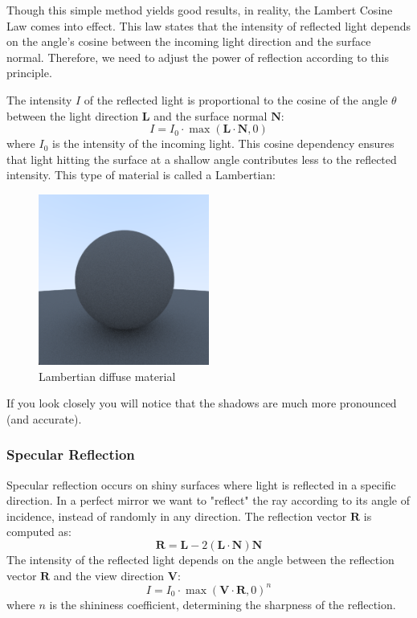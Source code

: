 \documentclass[12pt]{article}
\begin{document}
Though this simple method yields good results, in reality, the Lambert Cosine Law comes into effect. This law states that the intensity of reflected light depends on the angle's cosine between the incoming light direction and the surface normal. Therefore, we need to adjust the power of reflection according to this principle.

The intensity \(I\) of the reflected light is proportional to the cosine of the angle \(\theta\) between the light direction \(\mathbf{L}\) and the surface normal \(\mathbf{N}\):
\[
    I = I_0 \cdot \max(\mathbf{L} \cdot \mathbf{N}, 0)
\]
where \(I_0\) is the intensity of the incoming light. This cosine dependency ensures that light hitting the surface at a shallow angle contributes less to the reflected intensity.
This type of material is called a Lambertian:

\begin{figure}[H]
    \centering
    \includegraphics[width=0.5\textwidth]{images/lambertian/lambertian_diffuse.png}
    \caption{Lambertian diffuse material}
    \label{fig:lambdiffmat}
\end{figure}

If you look closely you will notice that the shadows are much more pronounced (and accurate).

\subsubsection{Specular Reflection}
Specular reflection occurs on shiny surfaces where light is reflected in a specific direction. In a perfect mirror we want to "reflect" the ray according to its angle of incidence, instead of randomly in any direction.
The reflection vector \(\mathbf{R}\) is computed as:
\[
    \mathbf{R} = \mathbf{L} - 2(\mathbf{L} \cdot \mathbf{N})\mathbf{N}
\]
The intensity of the reflected light depends on the angle between the reflection vector \(\mathbf{R}\) and the view direction \(\mathbf{V}\):
\[
    I = I_0 \cdot \max(\mathbf{V} \cdot \mathbf{R}, 0)^n
\]
where \(n\) is the shininess coefficient, determining the sharpness of the reflection.
\end{document}
